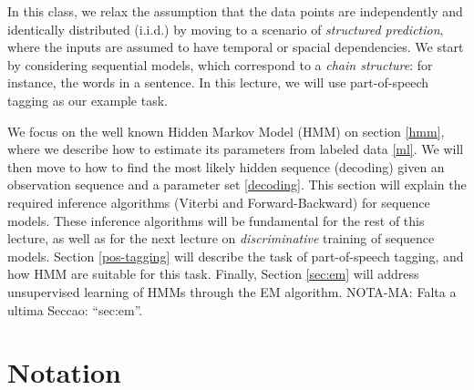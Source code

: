 

In this class, we relax the assumption that
the data points are independently and identically distributed (i.i.d.) 
by moving to a scenario of \emph{structured prediction}, where the inputs are assumed to have
temporal or spacial dependencies. We start by 
considering sequential models, which correspond to a \emph{chain structure}: for instance,
the words in a sentence. In this lecture, we will use part-of-speech
tagging as our example task.  

We focus on the well known Hidden Markov Model (HMM) on section
\ref{hmm}, where we describe how to estimate its parameters from labeled data
\ref{ml}. We will then move to how to find the most likely hidden sequence
(decoding) given an observation sequence and a parameter set
\ref{decoding}. This section will explain the required inference
algorithms (Viterbi and Forward-Backward) for sequence models. These
inference algorithms will be fundamental for the rest of this lecture,
as well as for the next lecture on \emph{discriminative} training of sequence
models. Section \ref{pos-tagging} will describe the task of 
part-of-speech tagging, and how HMM are suitable for this task. 
Finally, Section \ref{sec:em} will 
address unsupervised learning of HMMs through the EM
algorithm.
NOTA-MA: Falta a ultima Seccao: "`sec:em"'.

\section{Notation}

